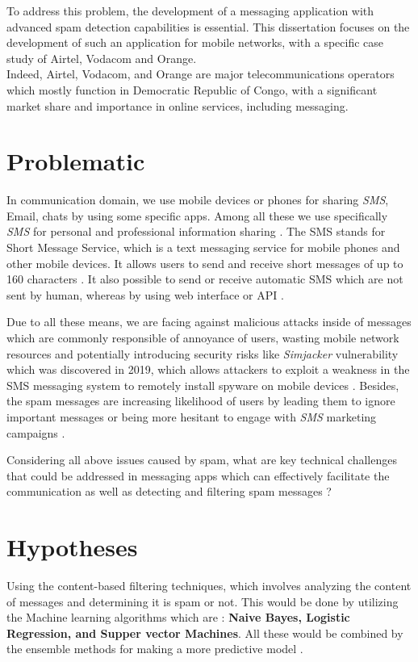 \documentclass[12pt,a4paper]{report}
\begin{document}
	To address this problem, the development of a messaging application with advanced spam detection capabilities is essential. This dissertation focuses on the development of such an application for mobile networks, with a specific case study of Airtel, Vodacom and Orange. \\
	Indeed, Airtel, Vodacom, and Orange are major telecommunications operators which mostly function in Democratic Republic of Congo, with a significant market share and importance in online services, including messaging. 
	 
	\section{Problematic} 
	In communication domain, we use mobile devices or phones for sharing \textit{SMS}, Email, chats by using some specific apps. Among all these we use specifically \textit{SMS} for personal and professional information sharing \cite{lavanya2582sms}. The SMS stands for Short Message Service, which is a text messaging service for mobile phones and other mobile devices. It allows users to send and receive short messages of up to 160 characters \cite{le2005mobile}. It also possible to send or receive automatic SMS which are not sent by human, whereas by using web interface or API \cite{jangir2016design}.
	
	Due to all these means, we are facing against malicious attacks inside of messages which are commonly responsible of annoyance of users, wasting mobile network resources and potentially introducing security risks like \textit{Simjacker} vulnerability which was discovered in 2019, which allows attackers to exploit a weakness in the SMS messaging system to remotely install spyware on mobile devices \cite{cimpanu2019simjacker}. Besides, the spam messages  are increasing likelihood of users by leading them to ignore important messages or being more hesitant to engage with \textit{SMS} marketing campaigns \cite{chen2017survey}. 
	
	Considering all above issues caused by spam, what are key technical challenges that could be addressed in messaging apps which can effectively facilitate the communication as well as detecting and filtering spam messages ? 
	
	\section{Hypotheses} 
	 Using the content-based filtering techniques, which involves analyzing the content of messages and determining it is spam or not. This would be done by utilizing the Machine learning algorithms which are : \textbf{Naive Bayes, Logistic Regression, and Supper vector Machines}. All these would be combined by the ensemble methods for making a more predictive model  \cite{raschka2017python}. 
	 
\end{document}
